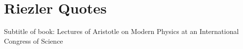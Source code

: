     




\section{Riezler Quotes}

Subtitle of book: Lectures of Aristotle on Modern Physics at an International Congress of Science

